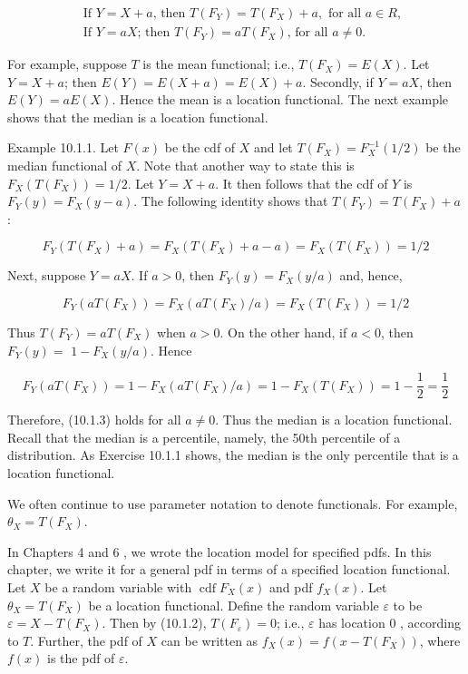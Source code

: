 \begin{align*}
& \text { If } Y=X+a \text {, then } T\left(F_{Y}\right)=T\left(F_{X}\right)+a, \text { for all } a \in R,  \tag{10.1.2}\\
& \text { If } Y=a X \text {; then } T\left(F_{Y}\right)=a T\left(F_{X}\right) \text {, for all } a \neq 0 . \tag{10.1.3}
\end{align*}


For example, suppose $T$ is the mean functional; i.e., $T\left(F_{X}\right)=E(X)$. Let $Y=X+a$; then $E(Y)=E(X+a)=E(X)+a$. Secondly, if $Y=a X$, then $E(Y)=a E(X)$. Hence the mean is a location functional. The next example shows that the median is a location functional.

Example 10.1.1. Let $F(x)$ be the cdf of $X$ and let $T\left(F_{X}\right)=F_{X}^{-1}(1 / 2)$ be the median functional of $X$. Note that another way to state this is $F_{X}\left(T\left(F_{X}\right)\right)=1 / 2$. Let $Y=X+a$. It then follows that the cdf of $Y$ is $F_{Y}(y)=F_{X}(y-a)$. The following identity shows that $T\left(F_{Y}\right)=T\left(F_{X}\right)+a$ :

$$
F_{Y}\left(T\left(F_{X}\right)+a\right)=F_{X}\left(T\left(F_{X}\right)+a-a\right)=F_{X}\left(T\left(F_{X}\right)\right)=1 / 2
$$

Next, suppose $Y=a X$. If $a>0$, then $F_{Y}(y)=F_{X}(y / a)$ and, hence,

$$
F_{Y}\left(a T\left(F_{X}\right)\right)=F_{X}\left(a T\left(F_{X}\right) / a\right)=F_{X}\left(T\left(F_{X}\right)\right)=1 / 2
$$

Thus $T\left(F_{Y}\right)=a T\left(F_{X}\right)$ when $a>0$. On the other hand, if $a<0$, then $F_{Y}(y)=$ $1-F_{X}(y / a)$. Hence

$$
F_{Y}\left(a T\left(F_{X}\right)\right)=1-F_{X}\left(a T\left(F_{X}\right) / a\right)=1-F_{X}\left(T\left(F_{X}\right)\right)=1-\frac{1}{2}=\frac{1}{2}
$$

Therefore, (10.1.3) holds for all $a \neq 0$. Thus the median is a location functional.\\
Recall that the median is a percentile, namely, the 50th percentile of a distribution. As Exercise 10.1.1 shows, the median is the only percentile that is a location functional.

We often continue to use parameter notation to denote functionals. For example, $\theta_{X}=T\left(F_{X}\right)$.

In Chapters 4 and 6 , we wrote the location model for specified pdfs. In this chapter, we write it for a general pdf in terms of a specified location functional. Let $X$ be a random variable with $\operatorname{cdf} F_{X}(x)$ and pdf $f_{X}(x)$. Let $\theta_{X}=T\left(F_{X}\right)$ be a location functional. Define the random variable $\varepsilon$ to be $\varepsilon=X-T\left(F_{X}\right)$. Then by (10.1.2), $T\left(F_{\varepsilon}\right)=0$; i.e., $\varepsilon$ has location 0 , according to $T$. Further, the pdf of $X$ can be written as $f_{X}(x)=f\left(x-T\left(F_{X}\right)\right)$, where $f(x)$ is the pdf of $\varepsilon$.

